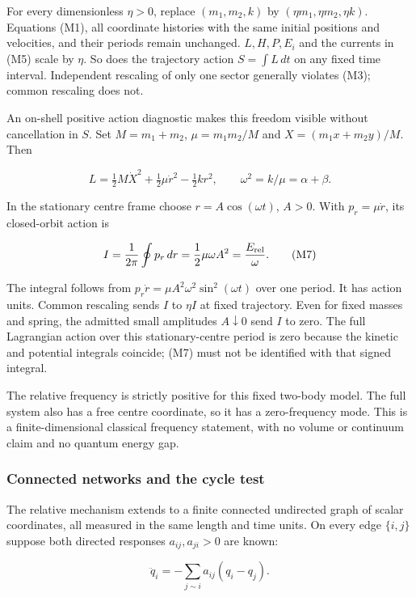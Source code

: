 \documentclass[11pt,a4paper]{article}
\begin{document}
For every dimensionless \(\eta>0\), replace \((m_1,m_2,k)\) by
\((\eta m_1,\eta m_2,\eta k)\). Equations (M1), all coordinate histories
with the same initial positions and velocities, and their periods remain
unchanged. \(L,H,P,E_i\) and the currents in (M5) scale by \(\eta\). So
does the trajectory action \(S=\int L\,dt\) on any fixed time interval.
Independent rescaling of only one sector generally violates (M3); common
rescaling does not.

An on-shell positive action diagnostic makes this freedom visible
without cancellation in \(S\). Set \(M=m_1+m_2\), \(\mu=m_1m_2/M\) and
\(X=(m_1x+m_2y)/M\). Then

\[L=\tfrac12M\dot X^2+\tfrac12\mu\dot r^2-\tfrac12kr^2,
\qquad \omega^2=k/\mu=\alpha+\beta. \tag{M6}\]

In the stationary centre frame choose \(r=A\cos(\omega t)\), \(A>0\).
With \(p_r=\mu\dot r\), its closed-orbit action is

\[I=\frac1{2\pi}\oint p_r\,dr
=\frac12\mu\omega A^2=\frac{E_{\rm rel}}\omega. \tag{M7}\]

The integral follows from \(p_r\dot r=\mu A^2\omega^2\sin^2(\omega t)\)
over one period. It has action units. Common rescaling sends \(I\) to
\(\eta I\) at fixed trajectory. Even for fixed masses and spring, the
admitted small amplitudes \(A\downarrow0\) send \(I\) to zero. The full
Lagrangian action over this stationary-centre period is zero because the
kinetic and potential integrals coincide; (M7) must not be identified
with that signed integral.

The relative frequency is strictly positive for this fixed two-body
model. The full system also has a free centre coordinate, so it has a
zero-frequency mode. This is a finite-dimensional classical frequency
statement, with no volume or continuum claim and no quantum energy gap.

\hypertarget{connected-networks-and-the-cycle-test}{%
\subsubsection{Connected networks and the cycle
test}\label{connected-networks-and-the-cycle-test}}

The relative mechanism extends to a finite connected undirected graph of
scalar coordinates, all measured in the same length and time units. On
every edge \(\{i,j\}\) suppose both directed responses
\(a_{ij},a_{ji}>0\) are known:

\[\ddot q_i=-\sum_{j\sim i}a_{ij}(q_i-q_j). \tag{M8}\]
\end{document}
